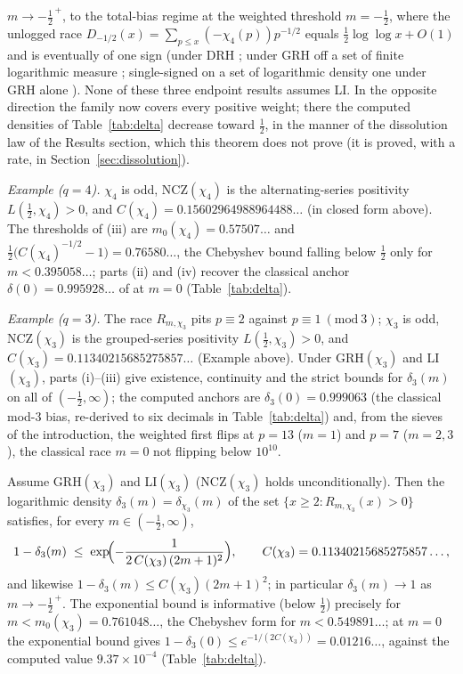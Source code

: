 \begin{theorem}
\begin{enumerate}
$m\to-\tfrac12^{\,+}$, to the
total-bias regime at the weighted threshold $m=-\tfrac12$, where the
unlogged race $D_{-1/2}(x)=\sum_{p\le x}(-\chi_4(p))p^{-1/2}$ equals
$\tfrac12\log\log x+O(1)$ and is eventually of one sign (under DRH
\cite{AK23}; under GRH off a set of finite logarithmic measure
\cite{Sheth24}; single-signed on a set of logarithmic density one under
GRH alone \cite{Hay25}). None of these three endpoint results assumes
LI. In the opposite direction the family now covers every positive
weight; there the computed densities of Table~\ref{tab:delta} decrease
toward $\tfrac12$, in the manner of the dissolution law of the Results
section, which this theorem does not prove (it is proved, with a rate,
in Section~\ref{sec:dissolution}).
\end{enumerate}
\end{theorem}

\medskip\noindent\emph{Example ($q=4$).} $\chi_4$ is odd,
NCZ$(\chi_4)$ is the alternating-series positivity
$L(\tfrac12,\chi_4)>0$, and $C(\chi_4)=0.15602964988964488\ldots$ (in
closed form above). The thresholds of (iii) are
$m_0(\chi_4)=0.57507\ldots$ and
$\tfrac12\bigl(C(\chi_4)^{-1/2}-1\bigr)=0.76580\ldots$, the Chebyshev
bound falling below $\tfrac12$ only for $m<0.395058\ldots$; parts (ii)
and (iv) recover the classical anchor $\delta(0)=0.995928\ldots$ of
\cite{RS94,FM13} at $m=0$ (Table~\ref{tab:delta}).

\medskip\noindent\emph{Example ($q=3$).} The race $R_{m,\chi_3}$ pits
$p\equiv2$ against $p\equiv1\ (\mathrm{mod}\ 3)$; $\chi_3$ is odd,
NCZ$(\chi_3)$ is the grouped-series positivity
$L(\tfrac12,\chi_3)>0$, and
$C(\chi_3)=0.11340215685275857\ldots$ (Example above). Under
GRH$(\chi_3)$ and LI$(\chi_3)$, parts (i)--(iii) give existence,
continuity and the strict bounds for $\delta_3(m)$ on all of
$(-\tfrac12,\infty)$; the computed anchors are $\delta_3(0)=0.999063$
(the classical mod-$3$ bias, re-derived to six decimals in
Table~\ref{tab:delta}) and, from the sieves of the introduction, the
weighted first flips at $p=13$ ($m=1$) and $p=7$ ($m=2,3$), the
classical race $m=0$ not flipping below $10^{10}$.

\begin{corollary}\label{cor:mod3rate}
Assume GRH$(\chi_3)$ and LI$(\chi_3)$ (NCZ$(\chi_3)$ holds
unconditionally). Then the logarithmic density
$\delta_3(m)=\delta_{\chi_3}(m)$ of the set
$\{x\ge2:R_{m,\chi_3}(x)>0\}$ satisfies, for every
$m\in(-\tfrac12,\infty)$,
\[
1-\delta_3(m)\;\le\;
\exp\!\Bigl(-\frac{1}{2\,C(\chi_3)\,(2m+1)^2}\Bigr),
\qquad
C(\chi_3)=0.11340215685275857\ldots,
\]
and likewise $1-\delta_3(m)\le C(\chi_3)(2m+1)^2$; in particular
$\delta_3(m)\to1$ as $m\to-\tfrac12^{\,+}$. The exponential bound is
informative (below $\tfrac12$) precisely for
$m<m_0(\chi_3)=0.761048\ldots$, the Chebyshev form for
$m<0.549891\ldots$; at $m=0$ the exponential bound gives
$1-\delta_3(0)\le e^{-1/(2C(\chi_3))}=0.01216\ldots$, against the
computed value $9.37\times10^{-4}$ (Table~\ref{tab:delta}).
\end{corollary}

